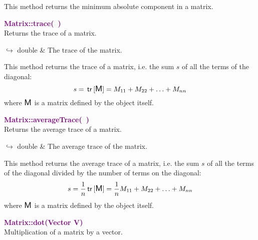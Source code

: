This method returns the minimum absolute component in a matrix.

\textcolor{purple}{\textbf{Matrix::trace(~)}}\label{Matrix::trace()}\\
Returns the trace of a matrix.\vspace*{-0.5em}
\begin{tcolorbox}[grow to left by=-1cm, width=\textwidth-1cm,myArgs,tabularx={l|R}]
$\hookrightarrow$ double & The trace of the matrix.
\end{tcolorbox}

This method returns the trace of a matrix, i.e. the sum $s$ of all the terms of the diagonal:
\begin{equation*}
s = \mbox{\ensuremath{\mathsf{\,tr\,}}}[\mbox{\large\ensuremath{\mathsf{M}}}] = M_{11}+M_{22}+\hdots+M_{nn}
\end{equation*}
where $\mbox{\large\ensuremath{\mathsf{M}}}$ is a matrix defined by the object itself.

\textcolor{purple}{\textbf{Matrix::averageTrace(~)}}\label{Matrix::averageTrace()}\\
Returns the average trace of a matrix.\vspace*{-0.5em}
\begin{tcolorbox}[grow to left by=-1cm, width=\textwidth-1cm,myArgs,tabularx={l|R}]
$\hookrightarrow$ double & The average trace of the matrix.
\end{tcolorbox}

This method returns the average trace of a matrix, i.e. the sum $s$ of all the terms of the diagonal divided by the number of terms on the diagonal:
\begin{equation*}
s = \frac{1}{n} \mbox{\ensuremath{\mathsf{\,tr\,}}}[\mbox{\large\ensuremath{\mathsf{M}}}] = \frac{1}{n} M_{11}+M_{22}+\hdots+M_{nn}
\end{equation*}
where $\mbox{\large\ensuremath{\mathsf{M}}}$ is a matrix defined by the object itself.

\textcolor{purple}{\textbf{Matrix::dot(Vector V)}}\label{Matrix::dot(Vector V)}\\
Multiplication of a matrix by a vector.

